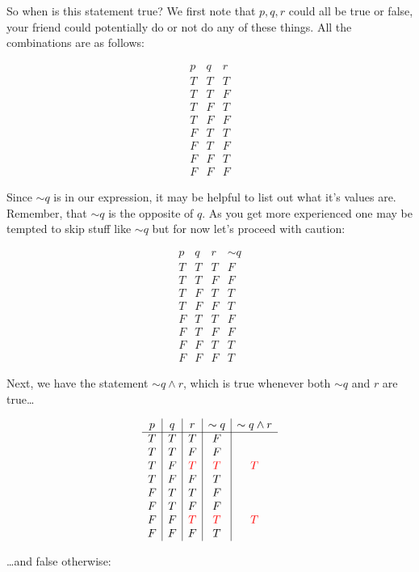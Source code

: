 So when is this statement true?  We first note that $p,q,r$ could all be true or false, your friend could potentially do or not do any of these things.  All the combinations are as follows:

 $$\begin{array}{c|c|c}
p&q&r\\
\hline
T & T&T\\
T&T&F\\
T&F&T\\
T&F&F\\
F & T&T\\
F&T&F\\
F&F&T\\
F&F&F
\end{array}$$

Since $\sim q$ is in our expression, it may be helpful to list out what it's values are.  Remember, that $\sim q$ is the opposite of $q$.  As you get more experienced one may be tempted to skip stuff like $\sim q$ but for now let's proceed with caution:

 $$\begin{array}{c|c|c|c}
p&q&r&\sim q\\
\hline
T & T&T&F\\
T&T&F&F\\
T&F&T&T\\
T&F&F&T\\
F & T&T&F\\
F&T&F&F\\
F&F&T&T\\
F&F&F&T
\end{array}$$

Next, we have the statement $\sim q \wedge r$, which is true whenever both $\sim q$ and $r$ are true\ldots

 $$\begin{array}{c|c|c|c|c}
p&q&r&\sim q & \sim q \wedge r\\
\hline
T & T&T&F & \\
T&T&F&F& \\
T&F&\textcolor{red}{T}&\textcolor{red}{T}&\textcolor{red}{T}\\
T&F&F&T\\
F & T&T&F\\
F&T&F&F\\
F&F&\textcolor{red}{T}&\textcolor{red}{T}&\textcolor{red}{T}\\
F&F&F&T
\end{array}$$

\ldots and false otherwise:

